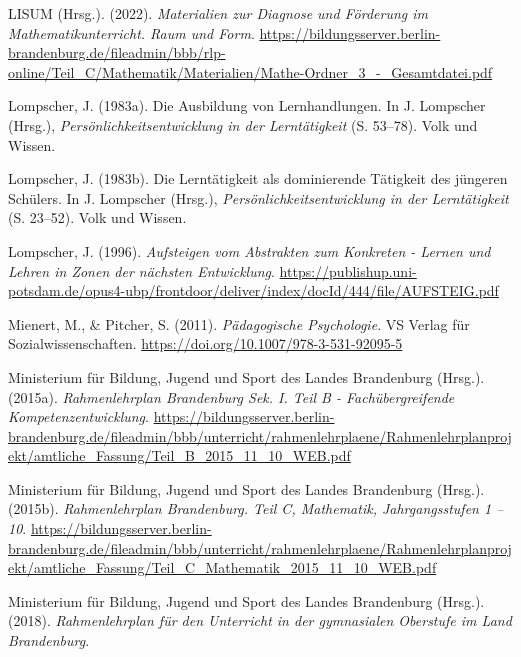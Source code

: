 \documentclass[
]{scrbook}
\newlength{\cslhangindent}
\newlength{\cslentryspacingunit} %
\newenvironment{CSLReferences}[2] %
 {%
  \setlength{\parindent}{0pt}
  \ifodd #1
  \let\oldpar\par
  \def\par{\hangindent=\cslhangindent\oldpar}
  \fi
  \setlength{\parskip}{#2\cslentryspacingunit}
 }%
 {}
\theoremstyle{definition}
\theoremstyle{definition}
\theoremstyle{definition}
\theoremstyle{definition}
\theoremstyle{remark}
\begin{document}
\begin{CSLReferences}{1}{0}
\leavevmode{}%
LISUM (Hrsg.). (2022). \emph{Materialien zur {Diagnose} und {Förderung} im {Mathematikunterricht}. {Raum} und {Form}}. \url{https://bildungsserver.berlin-brandenburg.de/fileadmin/bbb/rlp-online/Teil_C/Mathematik/Materialien/Mathe-Ordner_3_-_Gesamtdatei.pdf}

\leavevmode{}%
Lompscher, J. (1983a). Die {Ausbildung} von {Lernhandlungen}. In J. Lompscher (Hrsg.), \emph{Persönlichkeitsentwicklung in der {Lerntätigkeit}} (S. 53--78). Volk und Wissen.

\leavevmode{}%
Lompscher, J. (1983b). Die {Lerntätigkeit} als dominierende {Tätigkeit} des jüngeren {Schülers}. In J. Lompscher (Hrsg.), \emph{Persönlichkeitsentwicklung in der {Lerntätigkeit}} (S. 23--52). Volk und Wissen.

\leavevmode{}%
Lompscher, J. (1996). \emph{Aufsteigen vom {Abstrakten} zum {Konkreten} - {Lernen} und {Lehren} in {Zonen} der nächsten {Entwicklung}}. \url{https://publishup.uni-potsdam.de/opus4-ubp/frontdoor/deliver/index/docId/444/file/AUFSTEIG.pdf}

\leavevmode{}%
Mienert, M., \& Pitcher, S. (2011). \emph{Pädagogische {Psychologie}}. VS Verlag für Sozialwissenschaften. \url{https://doi.org/10.1007/978-3-531-92095-5}

\leavevmode{}%
Ministerium für Bildung, Jugend und Sport des Landes Brandenburg (Hrsg.). (2015a). \emph{Rahmenlehrplan {Brandenburg} {Sek}. {I}. {Teil} {B} - {Fachübergreifende} {Kompetenzentwicklung}}. \url{https://bildungsserver.berlin-brandenburg.de/fileadmin/bbb/unterricht/rahmenlehrplaene/Rahmenlehrplanprojekt/amtliche_Fassung/Teil_B_2015_11_10_WEB.pdf}

\leavevmode{}%
Ministerium für Bildung, Jugend und Sport des Landes Brandenburg (Hrsg.). (2015b). \emph{Rahmenlehrplan Brandenburg. Teil C, Mathematik, Jahrgangsstufen 1 -- 10}. \url{https://bildungsserver.berlin-brandenburg.de/fileadmin/bbb/unterricht/rahmenlehrplaene/Rahmenlehrplanprojekt/amtliche_Fassung/Teil_C_Mathematik_2015_11_10_WEB.pdf}

\leavevmode{}%
Ministerium für Bildung, Jugend und Sport des Landes Brandenburg (Hrsg.). (2018). \emph{Rahmenlehrplan für den {Unterricht} in der gymnasialen {Oberstufe} im {Land} {Brandenburg}}.


\end{CSLReferences}
\end{document}
